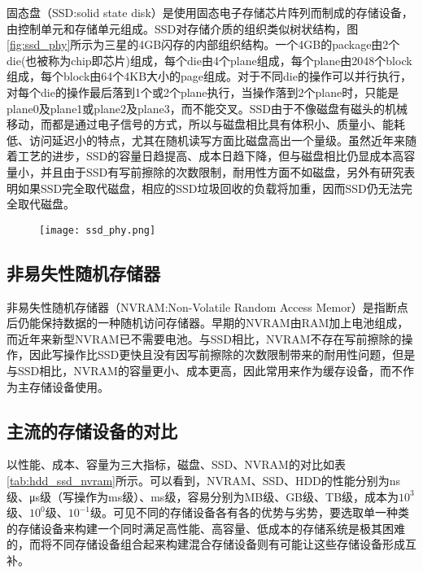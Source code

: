 固态盘（SSD:solid state disk）是使用固态电子存储芯片阵列而制成的存储设备，由控制单元和存储单元组成。SSD对存储介质的组织类似树状结构，图\ref{fig:ssd_phy}所示为三星的4GB闪存的内部组织结构\cite{agrawal2008design}。一个4GB的package由2个die(也被称为chip即芯片)组成，每个die由4个plane组成，每个plane由2048个block组成，每个block由64个4KB大小的page组成。对于不同die的操作可以并行执行，对每个die的操作最后落到1个或2个plane执行，当操作落到2个plane时，只能是plane0及plane1或plane2及plane3，而不能交叉。SSD由于不像磁盘有磁头的机械移动，而都是通过电子信号的方式，所以与磁盘相比具有体积小、质量小、能耗低、访问延迟小的特点\cite{agrawal2008design, dirik2009performance}，尤其在随机读写方面比磁盘高出一个量级。虽然近年来随着工艺的进步，SSD的容量日趋提高、成本日趋下降，但与磁盘相比仍显成本高容量小，并且由于SSD有写前擦除的次数限制，耐用性方面不如磁盘，另外有研究\cite{kgil2008improving}表明如果SSD完全取代磁盘，相应的SSD垃圾回收的负载将加重，因而SSD仍无法完全取代磁盘。

\begin{figure}[!htp]
  \centering
  \texttt{[image: ssd\_phy.png]}
  \hspace{1cm}
\end{figure}

\subsection{非易失性随机存储器}

非易失性随机存储器（NVRAM:Non-Volatile Random Access Memor）是指断点后仍能保持数据的一种随机访问存储器。早期的NVRAM由RAM加上电池组成，而近年来新型NVRAM已不需要电池。与SSD相比，NVRAM不存在写前擦除的操作，因此写操作比SSD更快且没有因写前擦除的次数限制带来的耐用性问题，但是与SSD相比，NVRAM的容量更小、成本更高，因此常用来作为缓存设备，而不作为主存储设备使用。

\subsection{主流的存储设备的对比}

以性能、成本、容量为三大指标，磁盘、SSD、NVRAM的对比如表\ref{tab:hdd_ssd_nvram}所示。可以看到，NVRAM、SSD、HDD的性能分别为ns级、μs级（写操作为ms级）、ms级，容易分别为MB级、GB级、TB级，成本为$10^{3}$级、$10^{0}$级、$10^{-1}$级。可见不同的存储设备各有各的优势与劣势，要选取单一种类的存储设备来构建一个同时满足高性能、高容量、低成本的存储系统是极其困难的，而将不同存储设备组合起来构建混合存储设备则有可能让这些存储设备形成互补。

